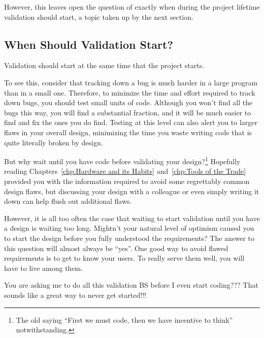 However, this leaves open the question of exactly when during the project
lifetime validation should start, a topic taken up by the next section.

\subsection{When Should Validation Start?}
\label{sec:debugging:When Should Validation Start?}

Validation should start at the same time that the project starts.

To see this, consider that tracking down a bug is much harder in a large
program than in a small one.
Therefore, to minimize the time and effort required to track down bugs,
you should test small units of code.
Although you won't find all the bugs this way, you will find a substantial
fraction, and it will be much easier to find and fix the ones you do find.
Testing at this level can also alert you to larger flaws in your overall
design, minimizing the time you waste writing code that is quite literally
broken by design.

But why wait until you have code before validating your design?\footnote{
	The old saying ``First we must code, then we have incentive to
	think'' notwithstanding.}
Hopefully reading Chapters~\ref{chp:Hardware and its Habits}
and~\ref{chp:Tools of the Trade} provided you with the information
required to avoid some regrettably common design flaws,
but discussing your design with a colleague or even simply writing it
down can help flush out additional flaws.

However, it is all too often the case that waiting to start validation
until you have a design is waiting too long.
Mightn't your natural level of optimism caused you to start the design
before you fully understood the requirements?
The answer to this question will almost always be ``yes''.
One good way to avoid flawed requirements is to get to know your users.
To really serve them well, you will have to live among them.

\QuickQuiz{}
	You are asking me to do all this validation BS before
	I even start coding???
	That sounds like a great way to never get started!!!
 \QuickQuizEnd

